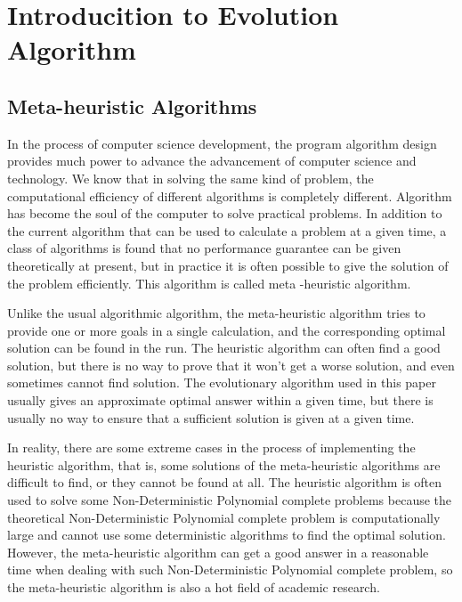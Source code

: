 
\section{Introducition to Evolution Algorithm}
\subsection{Meta-heuristic Algorithms}
%
In the process of computer science development, the program algorithm design 
provides much power to advance the advancement of computer science and 
technology. We know that in solving the same kind of problem, the 
computational efficiency of different algorithms is completely different. 
Algorithm has become the soul of the computer to solve practical problems. In 
addition to the current algorithm that can be used to calculate a problem at 
a given time, a class of algorithms is found that no performance guarantee 
can be given theoretically at present, but in practice it is often possible 
to give the solution of the problem efficiently. This algorithm is called meta
-heuristic algorithm.   

Unlike the usual algorithmic algorithm, the meta-heuristic algorithm tries to 
provide one or more goals in a single calculation, and the corresponding 
optimal solution can be found in the run. The heuristic algorithm can often 
find a good solution, but there is no way to prove that it won’t get a worse 
solution, and even sometimes cannot find solution. The evolutionary algorithm 
used in this paper usually gives an approximate optimal answer within a given 
time, but there is usually no way to ensure that a sufficient solution is 
given at a given time.

In reality, there are some extreme cases in the process of implementing the 
heuristic algorithm, that is, some solutions of the meta-heuristic algorithms 
are difficult to find, or they cannot be found at all. The heuristic 
algorithm is often used to solve some Non-Deterministic Polynomial complete 
problems because the theoretical Non-Deterministic Polynomial complete 
problem is computationally large and cannot use some deterministic algorithms 
to find the optimal solution. However, the meta-heuristic algorithm can get a 
good answer in a reasonable time when dealing with such Non-Deterministic 
Polynomial complete problem, so the meta-heuristic algorithm is also a hot 
field of academic research.

